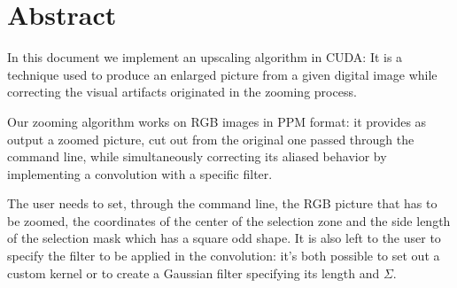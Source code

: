 \section*{Abstract}

In this document we implement an upscaling algorithm in CUDA: It is a technique used to produce an enlarged picture from a given digital image while correcting the visual artifacts originated in the zooming process.

Our zooming algorithm works on RGB images in PPM format:
it provides as output a zoomed picture, cut out from the original one passed through the command line, while simultaneously correcting its aliased behavior by implementing a convolution with a specific filter.

The user needs to set, through the command line, the RGB picture that has to be zoomed, the coordinates of the center of the selection zone and the side length of the selection mask which has a square odd shape.
It is also left to the user to specify the filter to be applied in the convolution: it's both possible to set out a custom kernel or to create a Gaussian filter specifying its length and $\Sigma$.
